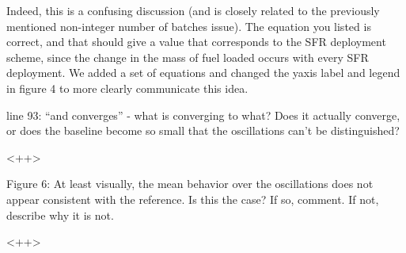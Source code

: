 \documentclass[answers,11pt]{exam}
\begin{document}
\begin{questions}
        \begin{solution}
                Indeed, this is a confusing discussion (and is closely related 
                to the previously mentioned non-integer number of batches 
                issue). The equation you listed is correct, and that should 
                give a value that corresponds to the SFR deployment scheme, 
                since the change in the mass of fuel loaded occurs with every 
                SFR deployment. We added a set of equations and changed the 
                yaxis label and legend in figure 4 to more clearly communicate 
                this idea.
        \end{solution}


        \question line 93: ``and converges'' - what is converging to what?  
        Does it actually converge, or does the baseline become so small that 
        the oscillations can't be distinguished?

        \begin{solution}
        <++>
        \end{solution}


        \question Figure 6: At least visually, the mean behavior over the 
        oscillations does not appear consistent with the reference.  Is this 
        the case? If so, comment.  If not, describe why it is not.

        \begin{solution}
        <++>
        \end{solution}


\end{questions}


\end{document}
